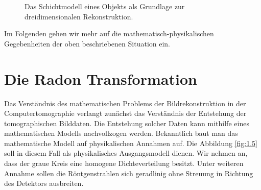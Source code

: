 \begin{figure}[h]
	\caption{Das Schichtmodell eines Objekts als Grundlage zur dreidimensionalen Rekonstruktion.}
	\label{fig:1.4}
\end{figure} 

Im Folgenden gehen wir mehr auf die mathematisch-physikalischen Gegebenheiten der oben beschriebenen Situation ein. 

\section{Die Radon Transformation}
\label{cha:1.2}

Das Verständnis des mathematischen Problems der Bildrekonstruktion in der Computertomographie verlangt zunächst das Verständnis der Entstehung der tomographischen Bilddaten. Die Entstehung solcher Daten kann mithilfe eines mathematischen Modells nachvollzogen werden. Bekanntlich baut man das mathematische Modell auf physikalischen Annahmen auf. Die Abbildung \ref{fig:1.5} soll in diesem Fall als physikalisches Ausgangsmodell dienen. Wir nehmen an, dass der graue Kreis eine homogene Dichteverteilung besitzt. Unter weiteren Annahme sollen die Röntgenstrahlen sich geradlinig ohne Streuung in Richtung des Detektors ausbreiten.

